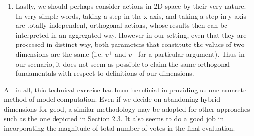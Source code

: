 \documentclass{article}
\begin{document}
\begin{enumerate}
\item Lastly, we should perhaps consider actions in 2D-space by their very nature. In very simple words, taking a step in the x-axis, and taking a step in y-axis are totally independent, orthogonal actions, whose results then can be interpreted in an aggregated way. However in our setting, even that they are processed in distinct way, both parameters that constitute the values of two dimensions are the same (i.e. $v^{+}$ and $v^{-}$ for a particular argument). Thus in our scenario, it does not seem as possible to claim the same orthogonal fundamentals with respect to definitions of our dimensions. 

\end{enumerate}


All in all,  this technical exercise has been beneficial in providing us one concrete method of model computation. Even if we decide on abandoning hybrid dimensions for good, a similar methodology may be adopted for other approaches such as the one depicted in Section 2.3. It also seems to do a good job in incorporating the magnitude of total number of votes in the final evaluation. 



%
%
\end{document}
